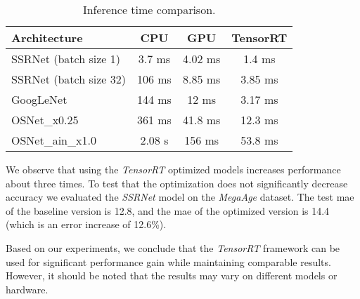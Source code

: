 \begin{table}[hbt!]
    \centering
    \begin{tabular}{l|c|c|c}
        \hline
        Architecture & CPU & GPU & TensorRT \\
        \hline
        SSRNet (batch size 1) & 3.7 ms & 4.02 ms & 1.4 ms \\
        SSRNet (batch size 32) & 106 ms & 8.85 ms & 3.85 ms \\
        GoogLeNet & 144 ms & 12 ms & 3.17 ms \\
        \hline
        OSNet\_x0.25 & 361 ms & 41.8 ms & 12.3 ms \\
        OSNet\_ain\_x1.0 & 2.08 s & 156 ms & 53.8 ms
    \end{tabular}
    \caption{Inference time comparison.}
    \label{tab:cpu_gpu_trt}
\end{table}

We observe that using the \textit{TensorRT} optimized models increases performance about three times. To test that the optimization does not significantly decrease accuracy we evaluated the \textit{SSRNet} model on the \textit{MegaAge}\cite{huang2016unsupervised_megaage} dataset. The test \gls{mae} of the baseline version is  12.8, and the \gls{mae} of the optimized version is 14.4 (which is an error increase of 12.6\%).

Based on our experiments, we conclude that the \textit{TensorRT} framework can be used for significant performance gain while maintaining comparable results. However, it should be noted that the results may vary on different models or hardware.
